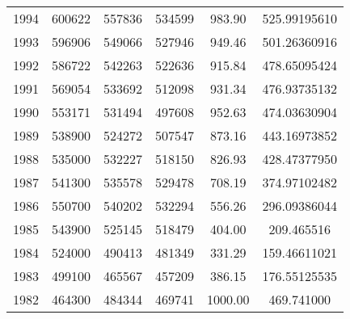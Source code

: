 \begin{tabular}{SSSSSS}
1994 & 600622 & 557836 & 534599 & 983.90 & 525.99195610 \\ 
1993 & 596906 & 549066 & 527946 & 949.46 & 501.26360916 \\ 
1992 & 586722 & 542263 & 522636 & 915.84 & 478.65095424 \\ 
1991 & 569054 & 533692 & 512098 & 931.34 & 476.93735132 \\ 
1990 & 553171 & 531494 & 497608 & 952.63 & 474.03630904 \\ 
1989 & 538900 & 524272 & 507547 & 873.16 & 443.16973852 \\ 
1988 & 535000 & 532227 & 518150 & 826.93 & 428.47377950 \\ 
1987 & 541300 & 535578 & 529478 & 708.19 & 374.97102482 \\ 
1986 & 550700 & 540202 & 532294 & 556.26 & 296.09386044 \\ 
1985 & 543900 & 525145 & 518479 & 404.00 & 209.465516 \\ 
1984 & 524000 & 490413 & 481349 & 331.29 & 159.46611021 \\ 
1983 & 499100 & 465567 & 457209 & 386.15 & 176.55125535 \\ 
1982 & 464300 & 484344 & 469741 & 1000.00 & 469.741000 \\ 


\end{tabular}
